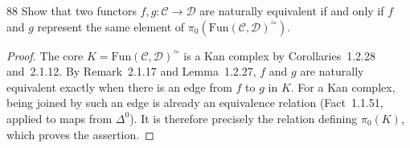\begin{exercise}{88}
Show that two functors $f,g\colon\mathcal C\to\mathcal D$ are naturally
equivalent if and only if $f$ and $g$ represent the same element of
$\pi_0(\mathrm{Fun}(\mathcal C,\mathcal D)^{\simeq})$.

\begin{proof}
The core $K=\mathrm{Fun}(\mathcal C,\mathcal D)^{\simeq}$ is a Kan complex
by Corollaries~1.2.28 and~2.1.12.
By Remark~2.1.17 and Lemma~1.2.27, $f$ and $g$ are naturally equivalent
exactly when there is an edge from $f$ to $g$ in $K$.
For a Kan complex, being joined by such an edge is already an equivalence
relation (Fact~1.1.51, applied to maps from $\Delta^0$).
It is therefore precisely the relation defining $\pi_0(K)$,
which proves the assertion.
\end{proof}
\end{exercise}
